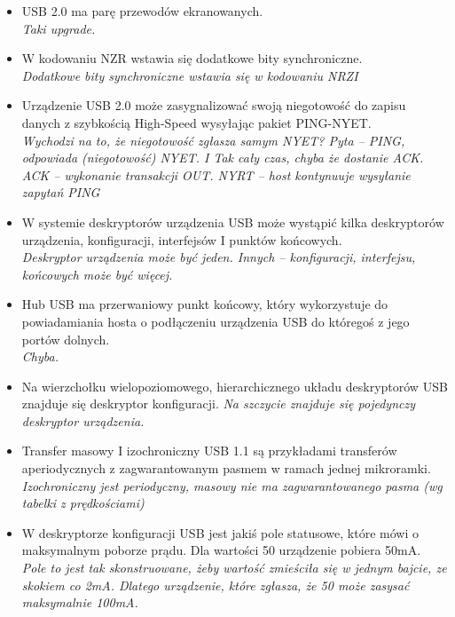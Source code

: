 \documentclass[a4paper,twoside]{article}
\begin{document}
\begin{itemize}
	\item \textcolor{tak}{USB 2.0 ma parę przewodów ekranowanych.} \\
	{\small \emph{Taki upgrade.}}
	
	\item \textcolor{nie}{W kodowaniu NZR wstawia się dodatkowe bity synchroniczne.} \\
	{\small \emph{Dodatkowe bity synchroniczne wstawia się w kodowaniu NRZI}}
		
	\item \textcolor{nie}{Urządzenie USB 2.0 może zasygnalizować swoją niegotowość do zapisu danych z szybkością High-Speed wysyłając pakiet PING-NYET.} \\
	{\small \emph{Wychodzi na to, że niegotowość zgłasza samym NYET? Pyta – PING, odpowiada (niegotowość) NYET. I Tak cały czas, chyba że dostanie ACK. ACK – wykonanie transakcji OUT. NYRT – host kontynuuje wysyłanie zapytań PING}}
	
	\item \textcolor{nie}{W systemie deskryptorów urządzenia USB może wystąpić kilka deskryptorów urządzenia, konfiguracji, interfejsów I punktów końcowych.} \\
	{\small \emph{Deskryptor urządzenia może być jeden. Innych – konfiguracji, interfejsu, końcowych może być więcej.}}
	
	\item \textcolor{tak}{Hub USB ma przerwaniowy punkt końcowy, który wykorzystuje do powiadamiania hosta o podłączeniu	urządzenia USB do któregoś z jego portów dolnych.} \\
	{\small \emph{Chyba.}}
	
	\item \textcolor{nie}{Na wierzchołku wielopoziomowego, hierarchicznego układu deskryptorów USB znajduje się deskryptor konfiguracji.}
	{\small \emph{Na szczycie znajduje się pojedynczy deskryptor urządzenia.}}
	
	\item \textcolor{nie}{Transfer masowy I izochroniczny USB 1.1 są przykładami transferów aperiodycznych z zagwarantowanym pasmem w ramach jednej mikroramki.} \\
	{\small \emph{Izochroniczny jest periodyczny, masowy nie ma zagwarantowanego pasma (wg tabelki z	prędkościami)}}
	
	\item \textcolor{nie}{W deskryptorze konfiguracji USB jest jakiś pole statusowe, które mówi o maksymalnym poborze prądu. Dla wartości 50 urządzenie pobiera 50mA.} \\
	{\small \emph{Pole to jest tak skonstruowane, żeby wartość zmieściła się w jednym bajcie, ze skokiem co 2mA. Dlatego urządzenie, które zgłasza, że 50 może zasysać maksymalnie 100mA.}}
	

\end{itemize}
\end{document}
